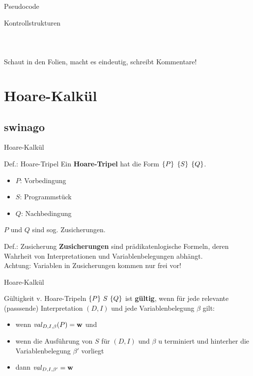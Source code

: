 \begin{frame}{Pseudocode}
\begin{block}{Kontrollstrukturen}
\begin{columns}
\begin{column}{0.45\textwidth}
\begin{tabular}[t]{ll}
   			\end{tabular}
		\end{column}
	\end{columns}

	Schaut in den Folien, macht es eindeutig, schreibt Kommentare!
\end{block}
    


\end{frame}




\section{Hoare-Kalkül}
\subsection{swinago}
\begin{frame}{Hoare-Kalkül}
	\begin{block}{Def.: Hoare-Tripel}
		Ein \textbf{Hoare-Tripel} hat die Form \textcolor{kit-red100}{$\left\{ P \right\}$} {$\left\{ S \right\}$} \textcolor{kit-red100}{$\left\{ Q \right\}$}.
		\begin{itemize}
			\item \textcolor{kit-red100}{$P$}: Vorbedingung
			\item $S$: Programmstück
			\item \textcolor{kit-red100}{$Q$}: Nachbedingung
		\end{itemize}
		$P$ und $Q$ sind sog. Zusicherungen.
	\end{block}

	\begin{block}{Def.: Zusicherung}
		\textbf{Zusicherungen} sind prädikatenlogische Formeln, deren Wahrheit von Interpretationen und Variablenbelegungen abhängt.\\
		Achtung: Variablen in Zusicherungen kommen nur frei vor!
	\end{block}
\end{frame}

\begin{frame}{Hoare-Kalkül}
	\begin{block}{Gültigkeit v. Hoare-Tripeln}
		$\left\{ P \right\} \, S \, \left\{ Q \right\}$ ist \textbf{gültig}, wenn für jede relevante (passsende) Interpretation $(D,I)$ und jede Variablenbelegung $\beta$ gilt:
		\begin{itemize}
			\item wenn $\hbox{\textit{val}}_{D,I,\beta}(P) = \mathbf{w}$ und
			\item wenn die Ausführung von $S$ für $(D,I)$ und $\beta$ u terminiert und hinterher die Variablenbelegung $\beta'$ vorliegt
			\item dann $\hbox{\textit{val}}_{D,I,\beta'} = \mathbf{w}$
		\end{itemize}
	\end{block}
\end{frame}






